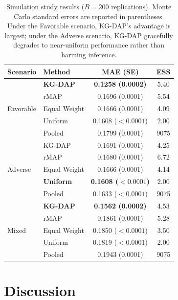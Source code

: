 \documentclass[12pt]{article}
\begin{document}
\begin{table}[t]
\centering
\caption{Simulation study results ($B = 200$ replications). Monte Carlo standard errors are reported in parentheses. Under the Favorable scenario, KG-DAP's advantage is largest; under the Adverse scenario, KG-DAP gracefully degrades to near-uniform performance rather than harming inference.}
\label{tab:simulation}
\begin{tabular}{llcc}
\toprule
Scenario & Method & MAE (SE) & ESS \\
\midrule
\multirow{5}{*}{Favorable}
& \textbf{KG-DAP} & \textbf{0.1258 (0.0002)} & 5.40 \\
& rMAP             & 0.1696 (0.0001)           & 5.54 \\
& Equal Weight     & 0.1666 (0.0001)           & 4.09 \\
& Uniform          & 0.1608 ($< 0.0001$)       & 2.00 \\
& Pooled           & 0.1799 (0.0001)           & 9075 \\
\midrule
\multirow{5}{*}{Adverse}
& KG-DAP           & 0.1691 (0.0001) & 4.25 \\
& rMAP             & 0.1680 (0.0001) & 6.72 \\
& Equal Weight     & 0.1666 (0.0001) & 4.14 \\
& \textbf{Uniform} & \textbf{0.1608 ($< 0.0001$)} & 2.00 \\
& Pooled           & 0.1633 ($< 0.0001$) & 9075 \\
\midrule
\multirow{5}{*}{Mixed}
& \textbf{KG-DAP} & \textbf{0.1562 (0.0002)} & 4.53 \\
& rMAP             & 0.1861 (0.0001)           & 5.28 \\
& Equal Weight     & 0.1850 ($< 0.0001$)      & 3.50 \\
& Uniform          & 0.1819 ($< 0.0001$)      & 2.00 \\
& Pooled           & 0.1943 (0.0001)           & 9075 \\
\bottomrule
\end{tabular}
\end{table}

\section{Discussion}
\label{sec:discussion}
\end{document}
